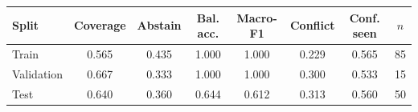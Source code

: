 \label{tab:rulebook_performance}
\begin{tabularx}{\linewidth}{@{}Y*{7}{C}@{}}
\toprule
\textbf{Split} & \textbf{Coverage} & \textbf{Abstain} & \textbf{Bal. acc.} & \textbf{Macro-F1} & \textbf{Conflict} & \textbf{Conf. seen} & \textbf{$n$}\\
\midrule
Train & 0.565 & 0.435 & 1.000 & 1.000 & 0.229 & 0.565 & 85\\
Validation & 0.667 & 0.333 & 1.000 & 1.000 & 0.300 & 0.533 & 15\\
Test & 0.640 & 0.360 & 0.644 & 0.612 & 0.313 & 0.560 & 50\\
\bottomrule
\end{tabularx}
